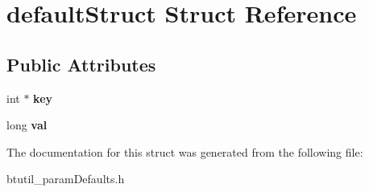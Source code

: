 \hypertarget{structdefaultStruct}{\section{default\-Struct Struct Reference}
\label{structdefaultStruct}
}
\subsection*{Public Attributes}
\begin{DoxyCompactItemize}
\item 
\hypertarget{structdefaultStruct_abd1fd37af5f1d4cfad755b0af3380f4f}{int $\ast$ {\bfseries key}}\label{structdefaultStruct_abd1fd37af5f1d4cfad755b0af3380f4f}

\item 
\hypertarget{structdefaultStruct_a0d3aa3b9b60ec7a29fb7359ab2ad93b0}{long {\bfseries val}}\label{structdefaultStruct_a0d3aa3b9b60ec7a29fb7359ab2ad93b0}

\end{DoxyCompactItemize}


The documentation for this struct was generated from the following file\-:\begin{DoxyCompactItemize}
\item 
btutil\-\_\-param\-Defaults.\-h\end{DoxyCompactItemize}
